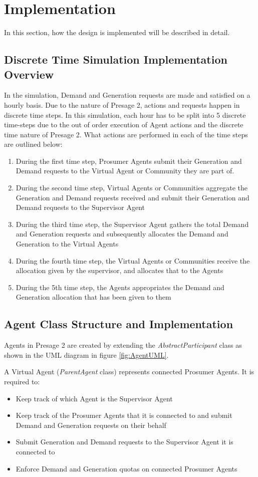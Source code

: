 \chapter{Implementation}
\label{Implementation}
In this section, how the design is implemented will be described in detail. 

\section*{Discrete Time Simulation Implementation Overview}
In the simulation, Demand and Generation requests are made and satisfied on a hourly basis. Due to the nature of Presage 2, actions and requests happen in discrete time steps. In this simulation, each hour has to be split into 5 discrete time-steps due to the out of order execution of Agent actions and the discrete time nature of Presage 2. What actions are performed in each of the time steps are outlined below:
\begin{enumerate}
	\item During the first time step, Prosumer Agents submit their Generation and Demand requests to the Virtual Agent or Community they are part of.
	\item During the second time step, Virtual Agents or Communities aggregate the Generation and Demand requests received and submit their Generation and Demand requests to the Supervisor Agent
	\item During the third time step, the Supervisor Agent gathers the total Demand and Generation requests and subsequently allocates the Demand and Generation to the Virtual Agents
	\item During the fourth time step, the Virtual Agents or Communities receive the allocation given by the supervisor, and allocates that to the Agents
	\item During the 5th time step, the Agents appropriates the Demand and Generation allocation that has been given to them
\end{enumerate}

\section*{Agent Class Structure and Implementation}
Agents in Presage 2 are created by extending the \textit{AbstractParticipant} class as shown in the \ac{UML} diagram in figure \ref{fig:AgentUML}. 

A Virtual Agent (\textit{ParentAgent} class) represents connected Prosumer Agents. It is required to:
\begin{itemize}
	\item Keep track of which Agent is the Supervisor Agent
	\item Keep track of the Prosumer Agents that it is connected to and submit Demand and Generation requests on their behalf
	\item Submit Generation and Demand requests to the Supervisor Agent it is connected to
	\item Enforce Demand and Generation quotas on connected Prosumer Agents
\end{itemize}

